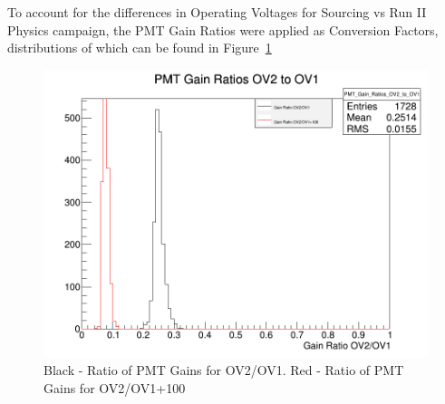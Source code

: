 To account for the differences in Operating Voltages for Sourcing vs Run II Physics campaign, the PMT Gain Ratios were applied as Conversion Factors, distributions of which can be found in Figure~\ref{fig:PMT_Gains}
\begin{figure}[!h]
	\begin{center}
		\includegraphics[width=.5\textwidth]{figures/ch_hfcalibration/GainRatios.png}
		\caption
		{Black - Ratio of PMT Gains for OV2/OV1. Red - Ratio of PMT Gains for OV2/OV1+100}
		\label{fig:PMT_Gains}
	\end{center}
\end{figure}




